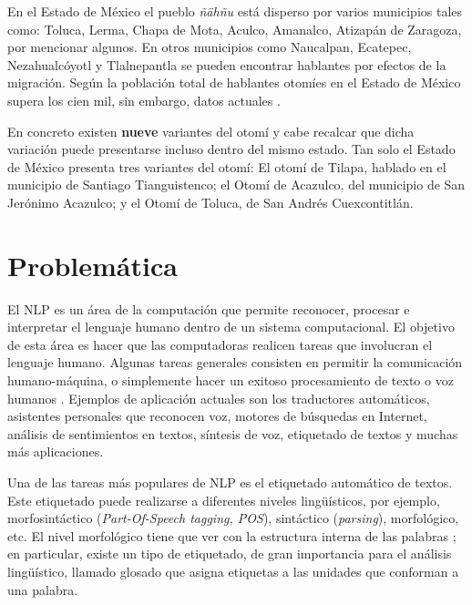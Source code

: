 \documentclass[letterpaper,12pt,oneside]{book}
\theoremstyle{definition}
\begin{document}
	
	En el Estado de México el pueblo \textit{ñähñu} está disperso por varios municipios tales como: Toluca, Lerma, Chapa de Mota, Aculco, Amanalco, Atizapán de Zaragoza, por mencionar algunos. En otros municipios como Naucalpan, Ecatepec, Nezahualcóyotl y Tlalnepantla se pueden encontrar hablantes por efectos de la migración. Según \citet{barrientos2004otomies} la población total de hablantes otomíes en el Estado de México supera los cien mil, sin embargo, datos actuales .

	
	En concreto existen \textbf{nueve} variantes del otomí y cabe recalcar que dicha variación puede presentarse incluso dentro del mismo estado. Tan solo el Estado de México presenta tres variantes del otomí: El otomí de Tilapa, hablado en el municipio de Santiago Tianguistenco; el Otomí de Acazulco, del municipio de San Jerónimo Acazulco; y el Otomí de Toluca, de San Andrés Cuexcontitlán.

	
	\section{Problemática}

	

	El NLP es un área de la computación que permite reconocer, procesar e interpretar el lenguaje humano dentro de un sistema computacional. El objetivo de esta área es hacer que las computadoras realicen tareas que involucran el lenguaje humano. Algunas tareas generales consisten en permitir la comunicación humano-máquina, o simplemente hacer un exitoso procesamiento de texto o voz humanos \citep{jurafsky2008speech}. Ejemplos de aplicación actuales son los traductores automáticos, asistentes personales que reconocen voz, motores de búsquedas en Internet, análisis de sentimientos en textos,  síntesis de voz, etiquetado de textos y muchas más aplicaciones.

	

	Una de las tareas más populares de NLP es el etiquetado automático de textos. Este etiquetado puede realizarse a diferentes niveles lingüísticos, por ejemplo, morfosintáctico (\textit{Part-Of-Speech tagging, POS}), sintáctico (\textit{parsing}), morfológico, etc.  El nivel morfológico tiene que ver con la estructura interna de las palabras \citep{haspelmath2013understanding}; en particular, existe un tipo de etiquetado, de gran importancia para el análisis lingüístico, llamado glosado que asigna etiquetas a las unidades que conforman a una palabra. 
\end{document}
